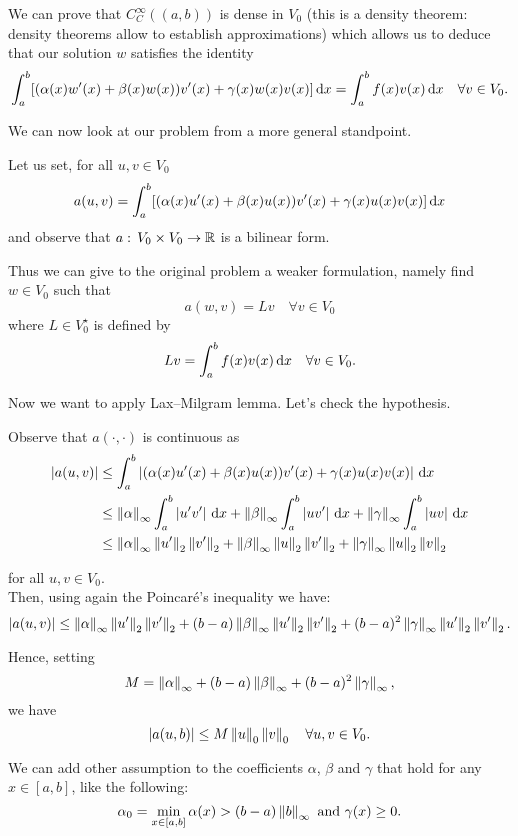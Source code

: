 We can prove that $C_C^\infty((a,b))$ is dense in $V_0$ (this is a density theorem: density theorems allow to establish approximations) which allows us to deduce that our solution $w$ satisfies the identity
$$ 
	\int_a^b [(\alpha(x)w'(x) + \beta(x)w(x))v'(x) + \gamma(x)w(x)v(x)]\,\mathrm d x = \int_a^bf(x) v(x) \, \mathrm d x \quad \forall v \in V_0. 
$$

We can now look at our problem from a more general standpoint.

Let us set, for all $u,v \in V_0$
$$
	a(u,v)
	= \int_a^b [(\alpha(x)u'(x) 
	+ \beta(x)u(x))v'(x) 
	+ \gamma(x)u(x)v(x)]\,\mathrm d x
$$
and observe that $a: \, V_0 \times V_0 \to \mathbb R$ is a bilinear form.

Thus we can give to the original problem a weaker formulation, namely find $w \in V_0$ such that
$$
	a(w,v)
	=Lv
	\quad \forall v \in V_0
$$
where $L \in V^\star_0$ is defined by 
$$
	Lv 
	= \int_a^b f(x)v(x)\, \mathrm d x 
	\quad \forall v \in V_0
	.
$$

Now we want to apply Lax--Milgram lemma. Let's check the hypothesis.

Observe that $a(\cdot, \cdot)$ is continuous as 
\begin{align*}
	\left\lvert a(u,v)\right\rvert 
	&\leq \int_a^b \left\lvert(\alpha(x)u'(x) 
	+ \beta(x)u(x))v'(x) 
	+ \gamma(x)u(x)v(x)\right\rvert\,\mathrm d x\\
	&\leq \left\lVert\alpha\right\rVert_\infty \int_a^b \left\lvert u'v'\right\rvert\,\mathrm d x
	+\left\lVert\beta\right\rVert_\infty \int_a^b \left\lvert uv'\right\rvert\,\mathrm d x
	+\left\lVert\gamma\right\rVert_\infty \int_a^b \left\lvert uv\right\rvert\,\mathrm d x\\
	&\leq \left\lVert\alpha\right\rVert_\infty \left\lVert u'\right\rVert_2 \left\lVert v'\right\rVert_2
	+ \left\lVert\beta\right\rVert_\infty \left\lVert u\right\rVert_2 \left\lVert v'\right\rVert_2
	+ \left\lVert\gamma\right\rVert_\infty \left\lVert u\right\rVert_2 \left\lVert v\right\rVert_2
\end{align*}

for all $u,v \in V_0$.\\
Then, using again the Poincaré's inequality we have:
$$
	\left\lvert a(u,v)\right\rvert\leq \left\lVert\alpha\right\rVert_\infty \left\lVert u'\right\rVert_2 \left\lVert v'\right\rVert_2
	+ (b-a)\left\lVert\beta\right\rVert_\infty \left\lVert u'\right\rVert_2 \left\lVert v'\right\rVert_2
	+ (b-a)^2 \left\lVert\gamma\right\rVert_\infty \left\lVert u'\right\rVert_2 \left\lVert v'\right\rVert_2
	.
$$

Hence, setting 
$$
	M = \left\lVert\alpha\right\rVert_\infty
	+ (b-a)\left\lVert\beta\right\rVert_\infty
	+ (b-a)^2\left\lVert\gamma\right\rVert_\infty
	,
$$
we have
$$
	\left\lvert a(u,b)\right\rvert 
	\leq M \left\lVert u\right\rVert_0\left\lVert v\right\rVert_0 
	\quad \forall u, v \in V_0
	.
$$

We can add other assumption to the coefficients $\alpha$, $\beta$ and $\gamma$ that hold for any $x \in [a,b]$, like the following:
$$
	\alpha_0
	= \min\limits_{x\in[a,b]} \alpha(x)
	> (b-a) \left\lVert b\right\rVert_\infty
	\text{ and }
	\gamma(x) 
	\geq 0
	.
$$

